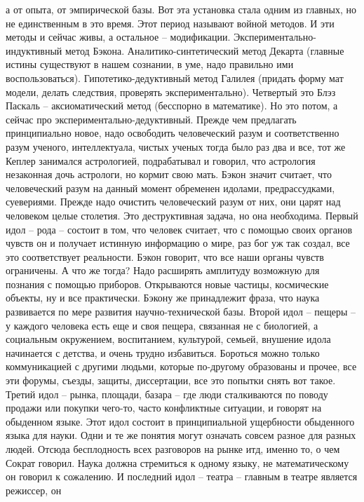 \documentclass[a4paper, 12pt]{article}
\begin{document}
а от опыта, от эмпирической базы. Вот эта установка стала одним из 
главных, но не единственным в это время. Этот период называют войной 
методов. И эти методы и сейчас живы, а остальное -- модификации. 
Экспериментально-индуктивный метод Бэкона. Аналитико-синтетический метод 
Декарта (главные истины существуют в нашем сознании, в уме, надо 
правильно ими воспользоваться). Гипотетико-дедуктивный метод Галилея 
(придать форму мат модели, делать следствия, проверять 
экспериментально). Четвертый это Блэз Паскаль -- аксиоматический метод 
(бесспорно в математике). Но это потом, а сейчас про 
экспериментально-дедуктивный. Прежде чем предлагать принципиально новое, 
надо освободить человеческий разум и соответственно разум ученого, 
интеллектуала, чистых ученых тогда было раз два и все, тот же Кеплер 
занимался астрологией, подрабатывал и говорил, что астрология незаконная 
дочь астрологи, но кормит свою мать. Бэкон значит считает, что 
человеческий разум на данный момент обременен идолами, предрассудками, 
суевериями. Прежде надо очистить человеческий разум от них, они царят 
над человеком целые столетия. Это деструктивная задача, но она 
необходима. Первый идол -- рода -- состоит в том, что человек считает, 
что с помощью своих органов чувств он и получает истинную информацию 
о мире, раз бог уж так создал, все это соответствует реальности. Бэкон 
говорит, что все наши органы чувств ограничены. А что же тогда? Надо 
расширять амплитуду возможную для познания с помощью приборов. 
Открываются новые частицы, космические объекты, ну и все практически. 
Бэкону же принадлежит фраза, что наука развивается по мере развития 
научно-технической базы. Второй идол -- пещеры -- у каждого человека 
есть еще и своя пещера, связанная не с биологией, а социальным 
окружением, воспитанием, культурой, семьей, внушение идола начинается 
с детства, и очень трудно избавиться. Бороться можно только 
коммуникацией с другими людьми, которые по-другому образованы и прочее, 
все эти форумы, съезды, защиты, диссертации, все это попытки снять вот 
такое. Третий идол -- рынка, площади, базара -- где люди сталкиваются по 
поводу продажи или покупки чего-то, часто конфликтные ситуации, 
и говорят на обыденном языке. Этот идол состоит в принципиальной 
ущербности обыденного языка для науки. Одни и те же понятия могут 
означать совсем разное для разных людей. Отсюда бесплодность всех 
разговоров на рынке итд, именно то, о чем Сократ говорил. Наука должна 
стремиться к одному языку, не математическому он говорил к сожалению. 
И последний идол -- театра -- главным в театре является режиссер, он 
\end{document}
